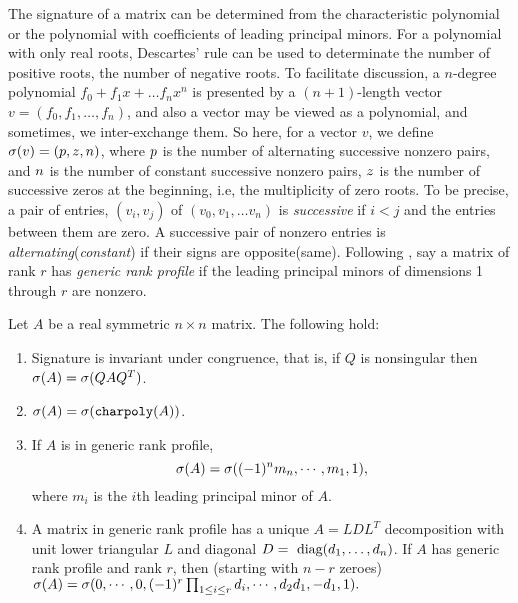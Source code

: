 \documentclass{acm_proc_article-sp}
\begin{document}
The signature of a matrix can be determined from
the characteristic polynomial or
the polynomial with coefficients of leading principal minors.
For a polynomial with only real roots, Descartes' rule can be used to 
determinate the number of positive roots, the number of negative roots.
To facilitate discussion,
a $n$-degree polynomial $f_0 + f_1 x + \ldots f_n x^n$ is presented by
a $(n+1)$-length vector $v = (f_0, f_1, \ldots, f_n)$, and also a vector
may be viewed as a polynomial, and sometimes, we inter-exchange them.
So here, for a vector $v$, we define 
$\sigma(v) = (p, z, n)$, where
$p$ is the number of alternating successive nonzero pairs, and 
$n$ is the number of constant successive nonzero pairs,
$z$ is the number of successive zeros at the beginning,
i.e, the multiplicity of zero roots.
To be precise, %
a pair of entries, $(v_i, v_j)$ of $(v_0, v_1, \ldots v_n)$ is {\em successive} 
if $i < j$ and the entries between them are zero.
A successive pair of nonzero entries is {\em alternating}({\em constant}) if 
their signs are opposite(same).
Following \cite{KaLo96:issac},
say a matrix of rank $r$ has 
{\em generic rank profile} if the leading principal minors 
of dimensions 1 through $r$ are nonzero. 

\begin{theorem} {\label{theorem:sig}}
Let $A$ be a real symmetric $n\times n$ matrix.
The following hold:
\begin{enumerate}
\item 
Signature is invariant under congruence, that is, if 
$Q$ is nonsingular then $\sigma(A) = \sigma(QAQ^T)$.
\item
$\sigma(A) = \sigma(\mbox{\tt charpoly}(A))$.\\
\item
If $A$ is in generic rank profile, 
$$\sigma(A) = \sigma((-1)^n m_n, \cdots, m_1, 1),$$
where $m_i$ is the $i$th leading principal minor of $A$.
\item
A matrix in generic rank profile has a unique $A = LDL^T$ decomposition with 
unit lower triangular $L$ and diagonal $D = \mbox{ diag}(d_1, \ldots, d_n)$.  If $A$
has generic rank profile and rank $r$, then (starting with $n-r$ zeroes)\\
$\sigma(A) = \sigma(0, \cdots, 0, (-1)^r\prod_{1 \leq i \leq r}d_i, 
\cdots, d_2 d_1, -d_1, 1).$
\end{enumerate}
\end{theorem}
\end{document}
